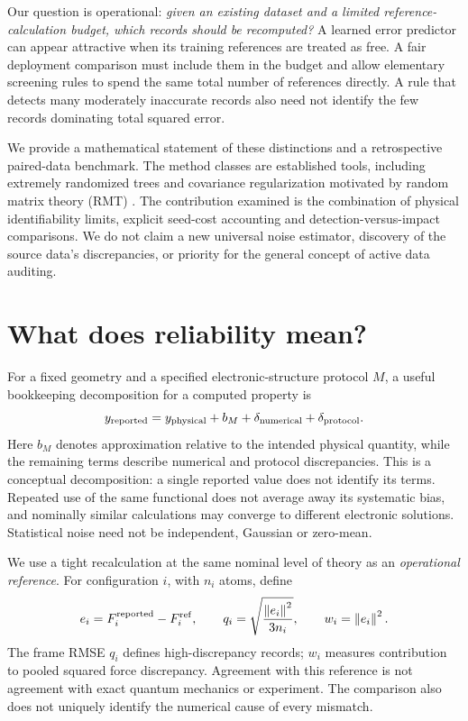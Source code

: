 \documentclass[11pt]{article}
\newcommand{\norm}[1]{\left\lVert #1\right\rVert}
\begin{document}
Our question is operational: \emph{given an existing dataset and a limited
reference-calculation budget, which records should be recomputed?} A learned
error predictor can appear attractive when its training references are treated
as free. A fair deployment comparison must include them in the budget and allow
elementary screening rules to spend the same total number of references directly.
A rule that detects many moderately inaccurate records also need not identify
the few records dominating total squared error.

We provide a mathematical statement of these distinctions and a retrospective
paired-data benchmark. The method classes are established tools, including
extremely randomized trees \citep{geurts2006} and covariance regularization motivated
by random matrix theory (RMT) \citep{marchenko1967,donoho2017}. The contribution
examined is the combination of physical identifiability limits, explicit seed-cost
accounting and detection-versus-impact comparisons. We do not claim a new universal
noise estimator, discovery of the source data's discrepancies, or priority for
the general concept of active data auditing.

\section{What does reliability mean?}
For a fixed geometry and a specified electronic-structure protocol $M$, a useful
bookkeeping decomposition for a computed property is
\begin{equation}\label{eq:error}
 y_{\rm reported}=y_{\rm physical}+b_M+\delta_{\rm numerical}
                  +\delta_{\rm protocol}.
\end{equation}
Here $b_M$ denotes approximation relative to the intended physical quantity, while
the remaining terms describe numerical and protocol discrepancies. This is a
conceptual decomposition: a single reported value does not identify its terms.
Repeated use of the same functional does not average away its systematic bias,
and nominally similar calculations may converge to different electronic solutions.
Statistical noise need not be independent, Gaussian or zero-mean.

We use a tight recalculation at the same nominal level of theory as an
\emph{operational reference}. For configuration $i$, with $n_i$ atoms, define
\begin{equation}\label{eq:targets}
 e_i=F_i^{\rm reported}-F_i^{\rm ref},\qquad
 q_i=\sqrt{\frac{\norm{e_i}^2}{3n_i}},\qquad w_i=\norm{e_i}^2.
\end{equation}
The frame RMSE $q_i$ defines high-discrepancy records; $w_i$ measures contribution
to pooled squared force discrepancy. Agreement with this reference is not
agreement with exact quantum mechanics or experiment. The comparison also does
not uniquely identify the numerical cause of every mismatch.
\end{document}
